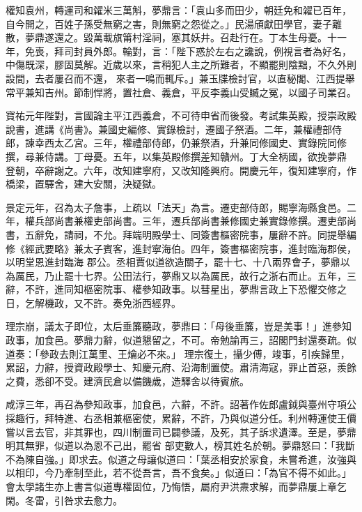 \begin{pinyinscope}
 權知袁州，轉運司和糴米三萬斛，夢鼎言：「袁山多而田少，朝廷免和糴已百年，自今開之，百姓子孫受無窮之害，則無窮之怨從之。」民湯頎獻田學官，妻子離散，夢鼎遂還之。毀萬載旗𥮉村淫祠，塞其妖井。召赴行在。丁本生母憂。十一年，免喪，拜司封員外郎。輪對，言：「陛下惑於左右之讒說，例視言者為好名，中傷既深，膠固莫解。近歲以來，言稍犯人主之所難者，不顯罷則陰黜，不久外則設間，去者屢召而不還，
 來者一鳴而輒斥。」兼玉牒檢討官，以直秘閣、江西提舉常平兼知吉州。節制悍將，置社倉、義倉，平反李義山受贓之冤，以國子司業召。



 寶祐元年陛對，言國論主平江西義倉，不可待申省而後發。考試集英殿，授崇政殿說書，進講《尚書》。兼國史編修、實錄檢討，遷國子祭酒。二年，兼權禮部侍郎，諫幸西太乙宮。三年，權禮部侍郎，仍兼祭酒，升兼同修國史、實錄院同修撰，尋兼侍講。丁母憂。五年，以集英殿修撰差知贛州。丁大全柄國，欲挽夢鼎
 登朝，卒辭謝之。六年，改知建寧府，又改知隆興府。開慶元年，復知建寧府，作橋梁，置驛舍，建大安關，決疑獄。



 景定元年，召為太子詹事，上疏以「法天」為言。遷吏部侍郎，賜寧海縣食邑。二年，權兵部尚書兼權吏部尚書。三年，遷兵部尚書兼修國史兼實錄修撰。遷吏部尚書，五辭免，請祠，不允。拜端明殿學士、同簽書樞密院事，屢辭不許。同提舉編修《經武要略》兼太子賓客，進封寧海伯。四年，簽書樞密院事，進封臨海郡侯，以明堂恩進封臨海
 郡公。丞相賈似道欲造關子，罷十七、十八兩界會子，夢鼎以為厲民，乃止罷十七界。公田法行，夢鼎又以為厲民，故行之浙右而止。五年，三辭，不許，進同知樞密院事、權參知政事。以彗星出，夢鼎言政上下恐懼交修之日，乞解機政，又不許。奏免浙西經界。



 理宗崩，議太子即位，太后垂簾聽政，夢鼎曰：「母後垂簾，豈是美事！」進參知政事，加食邑。夢鼎力辭，似道懇留之，不可。帝勉諭再三，詔閣門封還奏疏。似道奏：「參政去則江萬里、王爚必不來。」
 理宗復土，攝少傅，竣事，引疾歸里，累詔，力辭，授資政殿學士、知慶元府、沿海制置使。肅清海寇，罪止首惡，羨餘之費，悉卻不受。建濟民倉以備饑歲，造驛舍以待賓旅。



 咸淳三年，再召為參知政事，加食邑，六辭，不許。詔著作佐郎盧鉞與臺州守項公採趣行，拜特進、右丞相兼樞密使，累辭，不許，乃與似道分任。利州轉運使王價嘗以言去官，非其罪也，四川制置司已闢參議，及死，其子訴求遺澤。至是，夢鼎明其無罪，似道以為恩不己出，罷省
 部吏數人，榜其姓名於朝。夢鼎怒曰：「我斷不為陳自強。」即求去。似道之母讓似道曰：「葉丞相安於家食，未嘗希進，汝強與以相印，今乃牽制至此，若不從吾言，吾不食矣。」似道曰：「為官不得不如此。」會太學諸生亦上書言似道專權固位，乃悔悟，屬府尹洪燾求解，而夢鼎屢上章乞閑。冬雷，引咎求去愈力。




\end{pinyinscope}
